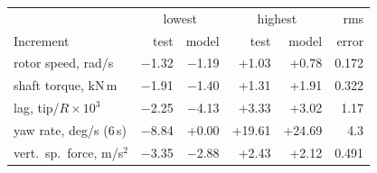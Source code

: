 \begin{tabular}{@{}lrrrrr@{}}
\toprule
& \multicolumn{2}{c}{lowest} & \multicolumn{2}{c}{highest} & rms \\
Increment & test & model & test & model & error \\
\midrule
rotor speed, rad/s & $-$1.32 & $-$1.19 & +1.03 & +0.78 & 0.172 \\
shaft torque, kN\,m & $-$1.91 & $-$1.40 & +1.31 & +1.91 & 0.322 \\
lag, tip/$R\times10^3$ & $-$2.25 & $-$4.13 & +3.33 & +3.02 & 1.17 \\
yaw rate, deg/s (6\,s) & $-$8.84 & +0.00 & +19.61 & +24.69 & 4.3 \\
vert.\ sp.\ force, m/s$^2$ & $-$3.35 & $-$2.88 & +2.43 & +2.12 & 0.491 \\
\bottomrule
\end{tabular}
